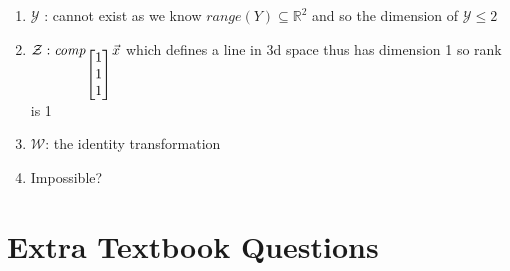 \documentclass[11pt]{book}
\begin{document}
\begin{enumerate}
\begin{enumerate}
            \item $\mathcal{Y}$ : cannot exist as we know $\mathit{range} {\left( Y \right)} \subseteq \mathbb{R}^2$ and so the dimension of $\mathcal{Y} \le 2$ 
            \item $\mathcal{Z}: \mathit{comp}_{\begin{bmatrix} 1 \\ 1 \\ 1 \end{bmatrix}} {\vec{x}} $ which defines a line in 3d space thus has dimension 1 so rank is 1 
            \item $\mathcal{W}$: the identity transformation
            \item Impossible?
        \end{enumerate}
\end{enumerate}



\section{Extra Textbook Questions}%
\label{sec:extra_textbook_questions}
\end{document}
